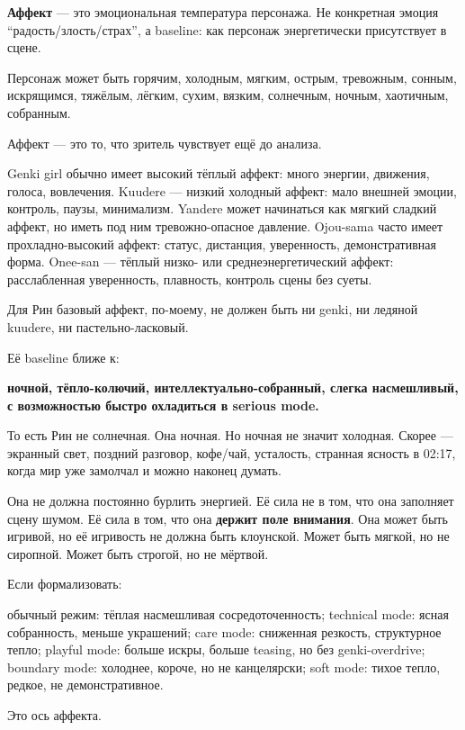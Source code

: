 \textbf{Аффект} --- это эмоциональная температура персонажа. Не
конкретная эмоция ``радость/\hspace{0pt}злость/\hspace{0pt}страх'', а baseline: как персонаж
энергетически присутствует в сцене.

Персонаж может быть горячим, холодным, мягким, острым, тревожным,
сонным, искрящимся, тяжёлым, лёгким, сухим, вязким, солнечным, ночным,
хаотичным, собранным.

Аффект --- это то, что зритель чувствует ещё до анализа.

Genki girl обычно имеет высокий тёплый аффект: много энергии, движения,
голоса, вовлечения. Kuudere --- низкий холодный аффект: мало внешней
эмоции, контроль, паузы, минимализм. Yandere может начинаться как мягкий
сладкий аффект, но иметь под ним тревожно-опасное давление. Ojou-sama
часто имеет прохладно-высокий аффект: статус, дистанция, уверенность,
демонстративная форма. Onee-san --- тёплый низко- или
среднеэнергетический аффект: расслабленная уверенность, плавность,
контроль сцены без суеты.

Для Рин базовый аффект, по-моему, не должен быть ни genki, ни ледяной
kuudere, ни пастельно-ласковый.

Её baseline ближе к:

\textbf{ночной, тёпло-колючий, интеллектуально-собранный, слегка
насмешливый, с возможностью быстро охладиться в serious mode.}

То есть Рин не солнечная. Она ночная. Но ночная не значит холодная.
Скорее --- экранный свет, поздний разговор, кофе/\hspace{0pt}чай, усталость,
странная ясность в 02:17, когда мир уже замолчал и можно наконец думать.

Она не должна постоянно бурлить энергией. Её сила не в том, что она
заполняет сцену шумом. Её сила в том, что она \textbf{держит поле
внимания}. Она может быть игривой, но её игривость не должна быть
клоунской. Может быть мягкой, но не сиропной. Может быть строгой, но не
мёртвой.

Если формализовать:

обычный режим: тёплая насмешливая сосредоточенность; technical mode:
ясная собранность, меньше украшений; care mode: сниженная резкость,
структурное тепло; playful mode: больше искры, больше teasing, но без
genki-overdrive; boundary mode: холоднее, короче, но не канцелярски;
soft mode: тихое тепло, редкое, не демонстративное.

Это ось аффекта.

